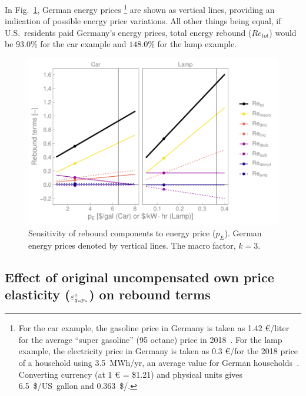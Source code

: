 \documentclass[12pt]{article}\usepackage[]{graphicx}\usepackage[]{xcolor}
\makeatletter
\def\maxwidth{ %
  \ifdim\Gin@nat@width>\linewidth
    \linewidth
  \else
    \Gin@nat@width
  \fi
}
\newenvironment{knitrout}{}{} %
\makeatother
\begin{document}
In Fig.~\ref{fig:all_Re_terms_p_E_graph}, German energy prices%
\footnote{
  For the car example,
  the gasoline price in Germany is taken as 1.42 \euro{}/liter for the average ``super gasoline'' (95 octane) 
  price in 2018~\citep{finanzen}.
  For the lamp example,
  the electricity price in Germany is taken as 0.3 \euro{}/\kWhr for the 2018 price of a household using 3.5~MWh/yr,
  an average value for German households~\citep{bundesministerium}.
  Converting currency (at 1 \euro{} = \$1.21) and
  physical units gives 
  6.5~\$/US~gallon and 
  0.363~\$/\kWhr.}
%
are shown as vertical lines,
providing an indication of possible energy price variations.
All other things being equal, 
if U.S.\ residents paid Germany's energy prices,
total energy rebound ($Re_{tot}$) would be 
$93.0$\%
for the car example and 
$148.0$\%
for the lamp example.

\begin{knitrout}
\color{fgcolor}\begin{figure}

{\centering \includegraphics[width=\maxwidth]{figure/all_Re_terms_p_E_graph-1} 

}

\caption[Sensitivity of rebound components to energy price ($p_E$)]{Sensitivity of rebound components to energy price ($p_E$). German energy prices denoted by vertical lines. The macro factor, $k = 3$.}\label{fig:all_Re_terms_p_E_graph}
\end{figure}

\end{knitrout}
  
  
\subsection{Effect of original uncompensated own price elasticity ($\varepsilon_{\dot{q}_s\!,p_s}^\circ$) on rebound terms} 
\label{sec:effect_of_elasticity}
\end{document}
